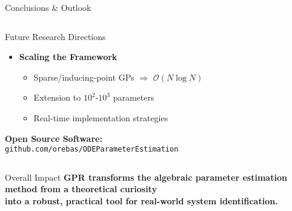 \documentclass[aspectratio=169]{beamer}
\begin{document}
\begin{frame}{Conclusions \& Outlook}
\begin{columns}[T]
\begin{column}{0.32\textwidth}
\begin{block}{\small Future Research Directions}
\begin{itemize}
          \item \textbf{Scaling the Framework}
          \begin{itemize}
            \tiny
            \item Sparse/inducing-point GPs $\Rightarrow$ $\mathcal{O}(N \log N)$
            \item Extension to $10^2$-$10^3$ parameters
            \item Real-time implementation strategies
          \end{itemize}
        \end{itemize}
      \end{block}
      
      \vspace{0.5em}
      \begin{center}
        \tiny
        \textbf{Open Source Software:}\\
        \texttt{github.com/orebas/ODEParameterEstimation}
        
        \vspace{0.3em}
      \end{center}
    \end{column}
    
  \end{columns}
  
  \vspace{1em}
  \begin{alertblock}{Overall Impact}
    \centering
    \footnotesize
    \textbf{GPR transforms the algebraic parameter estimation method from a theoretical curiosity} \\
    \textbf{into a robust, practical tool for real-world system identification.}
  \end{alertblock}
  
\end{frame}

\end{document}
